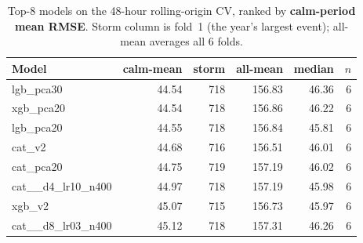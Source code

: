 \begin{table}[ht]
\centering
\caption{Top-8 models on the 48-hour rolling-origin CV, ranked by \textbf{calm-period mean RMSE}. Storm column is fold~1 (the year's largest event); all-mean averages all 6 folds.}
\label{tab:cv48}
\small
\begin{tabular}{lrrrrr}
\toprule
Model & calm-mean & storm & all-mean & median & $n$ \\
\midrule
  lgb\_pca30 & 44.54 & 718 & 156.83 & 46.36 & 6 \\
  xgb\_pca20 & 44.54 & 718 & 156.86 & 46.22 & 6 \\
  lgb\_pca20 & 44.55 & 718 & 156.84 & 45.81 & 6 \\
  cat\_v2 & 44.68 & 716 & 156.51 & 46.01 & 6 \\
  cat\_pca20 & 44.75 & 719 & 157.19 & 46.02 & 6 \\
  cat\_\_d4\_lr10\_n400 & 44.97 & 718 & 157.19 & 45.98 & 6 \\
  xgb\_v2 & 45.07 & 715 & 156.73 & 45.97 & 6 \\
  cat\_\_d8\_lr03\_n400 & 45.12 & 718 & 157.31 & 46.26 & 6 \\
\bottomrule
\end{tabular}
\end{table}
